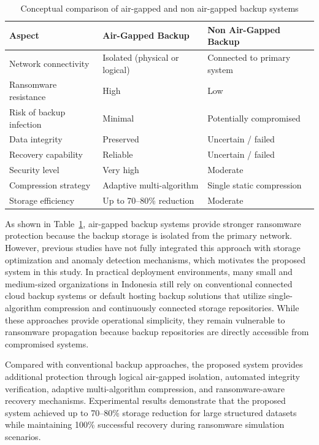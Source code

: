 \documentclass{iaesarticle}
\begin{document}
\begin{table}[H]
\centering
\fontsize{8pt}{10pt}\selectfont
\caption{Conceptual comparison of air-gapped and non air-gapped backup systems}
\label{tab:airgap_comparison}
\begin{tabularx}{\textwidth}{@{}p{3.2cm} X X@{}}
\hline
\textbf{Aspect} & \textbf{Air-Gapped Backup} & \textbf{Non Air-Gapped Backup} \\
\hline
Network connectivity & Isolated (physical or logical) & Connected to primary system \\
Ransomware resistance & High & Low \\
Risk of backup infection & Minimal & Potentially compromised \\
Data integrity & Preserved & Uncertain / failed \\
Recovery capability & Reliable & Uncertain / failed \\
Security level & Very high & Moderate \\
Compression strategy & Adaptive multi-algorithm & Single static compression \\
Storage efficiency & Up to 70--80\% reduction & Moderate \\
\hline
\end{tabularx}
\end{table}

As shown in Table~\ref{tab:airgap_comparison}, air-gapped backup systems provide stronger ransomware protection because the backup storage is isolated from the primary network. However, previous studies have not fully integrated this approach with storage optimization and anomaly detection mechanisms, which motivates the proposed system in this study. In practical deployment environments, many small and medium-sized organizations in Indonesia still rely on conventional connected cloud backup systems or default hosting backup solutions that utilize single-algorithm compression and continuously connected storage repositories. While these approaches provide operational simplicity, they remain vulnerable to ransomware propagation because backup repositories are directly accessible from compromised systems.

Compared with conventional backup approaches, the proposed system provides additional protection through logical air-gapped isolation, automated integrity verification, adaptive multi-algorithm compression, and ransomware-aware recovery mechanisms. Experimental results demonstrate that the proposed system achieved up to 70--80\% storage reduction for large structured datasets while maintaining 100\% successful recovery during ransomware simulation scenarios.
\end{document}
